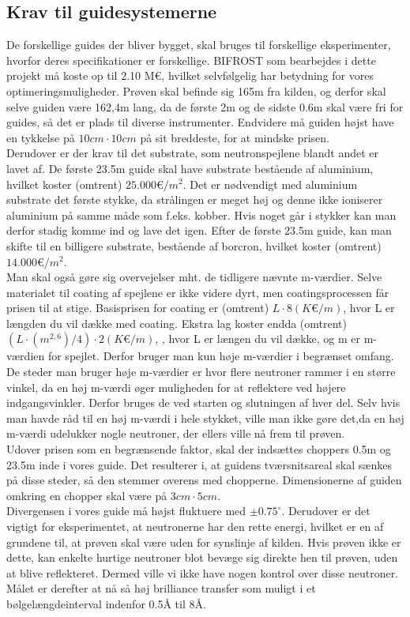 \documentclass[12pt,oneside,a4paper]{article}
\begin{document}
{{{{{\subsection{Krav til guidesystemerne}
De forskellige guides der bliver bygget, skal bruges til forskellige eksperimenter, hvorfor deres specifikationer er forskellige. BIFROST som bearbejdes i dette projekt må koste op til 2.10 M€, hvilket selvfølgelig har betydning for vores optimeringsmuligheder. Prøven skal befinde sig 165m fra kilden, og derfor skal selve guiden være 162,4m lang, da de første 2m og de sidste 0.6m skal være fri for guides, så det er plads til diverse instrumenter. Endvidere må guiden højst have en tykkelse på $10cm \cdot 10cm$ på sit breddeste, for at mindske prisen.
\\
Derudover er der krav til det substrate, som neutronspejlene blandt andet er lavet af. De første 23.5m guide skal have substrate bestående af aluminium, hvilket koster (omtrent) $25.000 \text{€}/m^2$. Det er nødvendigt med aluminium substrate det første stykke, da strålingen er meget høj og denne ikke ioniserer aluminium på samme måde som f.eks. kobber. Hvis noget går i stykker kan man derfor stadig komme ind og lave det igen. Efter de første 23.5m guide, kan man skifte til en billigere substrate, bestående af borcron, hvilket koster (omtrent) $14.000 \text{€}/m^2$.
\\
Man skal også gøre sig overvejelser mht. de tidligere nævnte m-værdier. Selve materialet til coating af spejlene er ikke videre dyrt, men coatingsprocessen får prisen til at stige. Basisprisen for coating er (omtrent) $L\cdot8(K\text{€}/m)$, hvor L er længden du vil dække med coating. Ekstra lag koster endda (omtrent) $(L\cdot(m^{2,6})/4)\cdot2(K\text{€}/m)$, , hvor L er længen du vil dække, og m er m-værdien for spejlet. Derfor bruger man kun høje m-værdier i begrænset omfang. De steder man bruger høje m-værdier er hvor flere neutroner rammer i en større vinkel, da en høj m-værdi øger muligheden for at reflektere ved højere indgangsvinkler. Derfor bruges de ved starten og slutningen af hver del. Selv hvis man havde råd til en høj m-værdi i hele stykket, ville man ikke gøre det,da en høj m-værdi udelukker nogle neutroner, der ellers ville nå frem til prøven.
\\
Udover prisen som en begrænsende faktor, skal der indsættes choppers 0.5m og 23.5m inde i vores guide. Det resulterer i, at guidens tværsnitsareal skal sænkes på disse steder, så den stemmer overens med chopperne. Dimensionerne af guiden omkring en chopper skal være på $3cm\cdot5cm$. 
\\
Divergensen i vores guide må højst fluktuere med $\pm0.75^\circ$. Derudover er det vigtigt for eksperimentet, at neutronerne har den rette energi, hvilket er en af grundene til, at prøven skal være uden for synslinje af kilden. Hvis prøven ikke er dette, kan enkelte hurtige neutroner blot  bevæge sig direkte hen til prøven, uden at blive reflekteret. Dermed ville vi ikke have nogen kontrol over disse neutroner.
\\
Målet er derefter at nå så høj brilliance transfer som muligt i et bølgelængdeinterval indenfor 0.5Å til 8Å.

}}}}}
\end{document}
